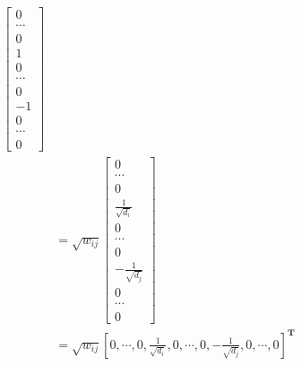 \documentclass[oneside]{book}
\begin{document}
{{\begin{align}
                \begin{bmatrix}
                    0\\
                    \cdots\\
                    0\\
                    1\\
                    0\\
                    \cdots\\
                    0\\
                    -1\\
                    0\\
                    \cdots\\
                    0
                \end{bmatrix}\\
                &=\sqrt{w_{ij}}
                \begin{bmatrix}
                    0\\
                    \cdots\\
                    0\\
                    \frac{1}{\sqrt{d_{i}}}\\
                    0\\
                    \cdots\\
                    0\\
                    -\frac{1}{\sqrt{d_{j}}}\\
                    0\\
                    \cdots\\
                    0
                \end{bmatrix}\\
                &=\sqrt{w_{ij}}\left[0,\cdots,0,\frac{1}{\sqrt{d_{i}}},0,\cdots,0,-\frac{1}{\sqrt{d_{j}}},0,\cdots,0\right]^{\mathbf{T}}
        \end{align}
    }
}
\end{document}
